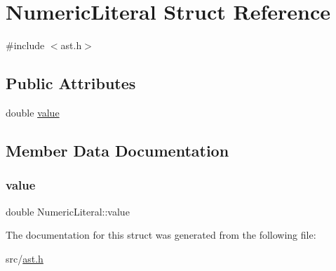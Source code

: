 \hypertarget{struct_numeric_literal}{}\section{Numeric\+Literal Struct Reference}
\label{struct_numeric_literal}


{\ttfamily \#include $<$ast.\+h$>$}

\subsection*{Public Attributes}
\begin{DoxyCompactItemize}
\item 
double \hyperlink{struct_numeric_literal_adeef869e11ca886648a0ccb723dc6639}{value}
\end{DoxyCompactItemize}


\subsection{Member Data Documentation}
\mbox{\label{struct_numeric_literal_adeef869e11ca886648a0ccb723dc6639}} 
\subsubsection{\texorpdfstring{value}{value}}
{\footnotesize\ttfamily double Numeric\+Literal\+::value}



The documentation for this struct was generated from the following file\+:\begin{DoxyCompactItemize}
\item 
src/\hyperlink{ast_8h}{ast.\+h}\end{DoxyCompactItemize}
